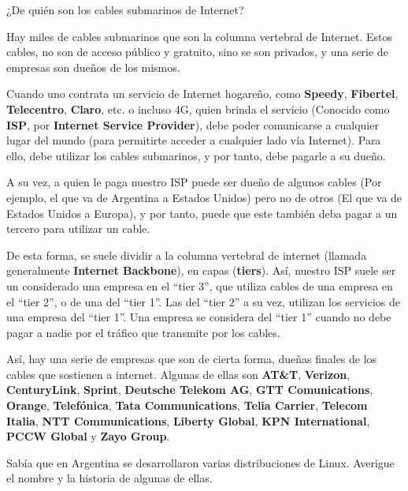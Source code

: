 \begin{exercise}
¿De quién son los cables submarinos de Internet?
\end{exercise}

Hay miles de cables submarinos que son la columna vertebral de Internet. Estos
cables, no son de acceso público y gratuito, sino se son privados, y una serie
de empresas son dueños de los mismos.

Cuando uno contrata un servicio de Internet hogareño, como \textbf{Speedy},
\textbf{Fibertel}, \textbf{Telecentro}, \textbf{Claro}, etc. o incluso 4G, quien
brinda el servicio (Conocido como \textbf{ISP}, por \textbf{Internet Service
Provider}), debe poder comunicarse a cualquier lugar del mundo (para permitirte
acceder a cualquier lado vía Internet). Para ello, debe utilizar los cables
submarinos, y por tanto, debe pagarle a su dueño.

A su vez, a quien le paga nuestro ISP puede ser dueño de algunos cables (Por
ejemplo, el que va de Argentina a Estados Unidos) pero no de otros (El que va de
Estados Unidos a Europa), y por tanto, puede que este también deba pagar a un
tercero para utilizar un cable.

De esta forma, se suele dividir a la columna vertebral de internet (llamada
generalmente \textbf{Internet Backbone}), en capas (\textbf{tiers}). Así,
nuestro ISP suele ser un considerado una empresa en el ``tier 3'', que utiliza
cables de una empresa en el ``tier 2'', o de una del ``tier 1''. Las del ``tier
2'' a su vez, utilizan los servicios de una empresa del ``tier 1''. Una empresa
se considera del ``tier 1'' cuando no debe pagar a nadie por el tráfico que
transmite por los cables.

Así, hay una serie de empresas que son de cierta forma, dueñas finales de los
cables que sostienen a internet. Algunas de ellas son \textbf{AT\&T},
\textbf{Verizon}, \textbf{CenturyLink}, \textbf{Sprint}, \textbf{Deutsche
Telekom AG}, \textbf{GTT Comunications}, \textbf{Orange}, \textbf{Telefónica},
\textbf{Tata Communications}, \textbf{Telia Carrier}, \textbf{Telecom Italia},
\textbf{NTT Communications}, \textbf{Liberty Global}, \textbf{KPN
International}, \textbf{PCCW Global} y \textbf{Zayo Group}.
\vspace{1cm}

\begin{exercise}
Sabía que en Argentina se desarrollaron varias distribuciones de Linux. Averigue
el nombre y la historia de algunas de ellas.
\end{exercise}


